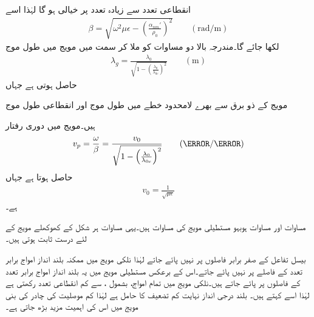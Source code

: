 انقطاعی تعدد سے زیادہ تعدد پر  خیالی ہو گا لہٰذا اسے
\begin{align}
\beta=\sqrt{\omega^2 \mu\epsilon-\left(\frac{\alpha_{nm}'}{\rho_0}\right)^2} \quad \quad (\si{\radian/\meter})
\end{align}
لکھا جائے گا۔مندرجہ بالا دو مساوات کو ملا کر  سمت میں مویج میں طول موج
\begin{align}\label{مساوات_مویج_نلکی_طول_موج}
\lambda_g=\frac{\lambda_0}{\sqrt{1-\left(\frac{\lambda_0}{\lambda_{0c}}\right)^2}} \quad \quad (\si{\meter})
\end{align}
حاصل ہوتی ہے جہاں
\begin{description}
 مویج کے ذو برق سے بھرے لامحدود خطے میں طول موج اور
 انقطاعی طول موج
\end{description}
ہیں۔مویج میں دوری رفتار 
\begin{align}\label{مساوات_مویج_نلکی_دوری_رفتار}
v_p=\frac{\omega}{\beta}=\frac{v_0}{\sqrt{1-\left(\frac{\lambda_0}{\lambda_{0c}}\right)^2}} \quad \quad (\meter / \second)
\end{align}
حاصل ہوتا ہے جہاں
\begin{align*}
v_0=\frac{1}{\sqrt{\mu \epsilon}}
\end{align*}
ہے۔

مساوات  اور مساوات  ہوبہو مستطیلی مویج کی مساوات ہیں۔یہی مساوات ہر شکل کے کھوکھلے مویج کے لئے درست ثابت ہوتی ہیں۔ 

بیسل تفاعل کے صفر برابر فاصلوں پر نہیں پائے جاتے لہٰذا نلکی مویج میں ممکنہ بلند انداز امواج برابر تعدد کے فاصلے پر نہیں پائے جاتے۔اس کے برعکس مستطیلی مویج میں یہ بلند انداز امواج برابر تعدد کے فاصلوں پر پائے جاتے ہیں۔نلکی مویج میں  تمام امواج، بشمول ، سے کم انقطاعی تعدد رکھتی ہے لہٰذا اسے   کہتے ہیں۔ بلند درجی انداز نہایت کم  تضعیف کا حامل ہے لہٰذا کم موصلیت کی چادر کی بنی مویج میں اس کی اہمیت مزید بڑھ جاتی ہے۔

